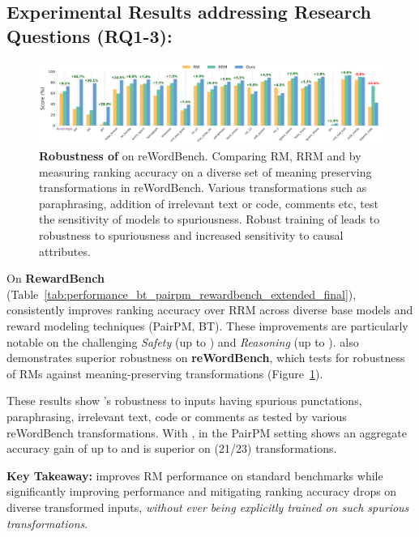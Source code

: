 \subsection{Experimental Results addressing Research Questions (RQ1-3):}
\label{subsec:experimental_results}

\begin{figure}[ht]
  \centering
  \includegraphics[width=1.0\columnwidth]{images/reword_absolute_robustness_gemma9b_pairpm_sorted.pdf}
  \caption{\textbf{Robustness of \carma{}} on reWordBench. Comparing RM, RRM and \carma{} by measuring ranking accuracy on a diverse set of meaning preserving transformations in reWordBench. Various transformations such as paraphrasing, addition of irrelevant text or code, comments etc, test the sensitivity of models to spuriousness. Robust training of \carma{} leads to robustness to spuriousness and increased sensitivity to causal attributes.
  }
  \label{fig:reword_absolute_robustness_gemma9b_pairpm}
\vspace{0.2in}  
\end{figure}

On \textbf{RewardBench} (Table~\ref{tab:performance_bt_pairpm_rewardbench_extended_final}), \carma{} consistently improves ranking accuracy over RRM across diverse base models and reward modeling techniques (PairPM, BT).
These improvements are particularly notable on the challenging \textit{Safety} (up to ) and \textit{Reasoning} (up to ). \carma{} also demonstrates superior robustness on \textbf{reWordBench}, which tests for robustness of RMs against meaning-preserving transformations (Figure~\ref{fig:reword_absolute_robustness_gemma9b_pairpm}). 

These results show \carma{}'s robustness to inputs having spurious punctations, paraphrasing, irrelevant text, code or comments as tested by various reWordBench transformations. With , \carma{} in the PairPM setting shows an aggregate accuracy gain of up to  and is superior on \textcolor{PaperGreen}{(21/23)} transformations.

\vspace{0.25in}
\begin{takeawaybox}
\textbf{Key Takeaway:} \carma{} improves RM performance on standard benchmarks while significantly improving performance and mitigating ranking accuracy drops on diverse transformed inputs, \textit{without ever being explicitly trained on such spurious transformations}.
\end{takeawaybox}
\vspace{0.1in}

